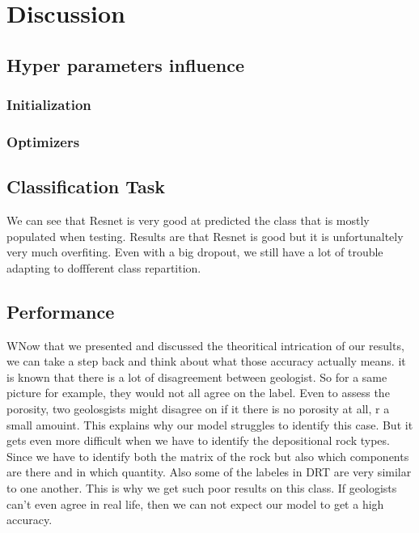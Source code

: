 \chapter{Discussion}\label{chp:discussion}
\section{Hyper parameters influence}
\subsection{Initialization}
\subsection{Optimizers}
\section{Classification Task}
We can see that Resnet is very good at predicted the class that is mostly populated when testing. Results are that Resnet is good but it is unfortunaltely very much overfiting. Even with a big dropout, we still have a lot of trouble adapting to doffferent class repartition. 
\section{Performance}
WNow that we presented and discussed the theoritical intrication of our results, we can take a step back and think about what those accuracy actually means. it is known that there is a lot of disagreement between geologist. So for a same picture for example, they would not all agree on the label. 
Even to assess the porosity, two geolosgists might disagree on if it there is no porosity at all, r a small amouint. This explains why our model struggles to identify this case. But it gets even more difficult when we have to identify the depositional rock types. Since we have to identify both the matrix of the rock but also which components are there and in which quantity. Also some of the labeles in DRT are very similar to one another. This is why we get such poor results on this class. If geologists can't even agree in real life, then we can not expect our model to get a high accuracy. 